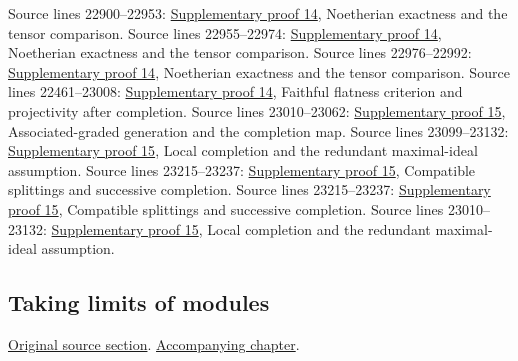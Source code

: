 \begin{AlgebraSourceRoutes}
 Source lines 22900--22953: \hyperlink{algebra_projectivity_completion_notes_20260927}{Supplementary proof 14}, Noetherian exactness and the tensor comparison.
 Source lines 22955--22974: \hyperlink{algebra_projectivity_completion_notes_20260927}{Supplementary proof 14}, Noetherian exactness and the tensor comparison.
 Source lines 22976--22992: \hyperlink{algebra_projectivity_completion_notes_20260927}{Supplementary proof 14}, Noetherian exactness and the tensor comparison.
 Source lines 22461--23008: \hyperlink{algebra_projectivity_completion_notes_20260927}{Supplementary proof 14}, Faithful flatness criterion and projectivity after completion.
 Source lines 23010--23062: \hyperlink{algebra_graded_completion_notes_20260927}{Supplementary proof 15}, Associated-graded generation and the completion map.
 Source lines 23099--23132: \hyperlink{algebra_graded_completion_notes_20260927}{Supplementary proof 15}, Local completion and the redundant maximal-ideal assumption.
 Source lines 23215--23237: \hyperlink{algebra_graded_completion_notes_20260927}{Supplementary proof 15}, Compatible splittings and successive completion.
 Source lines 23215--23237: \hyperlink{algebra_graded_completion_notes_20260927}{Supplementary proof 15}, Compatible splittings and successive completion.
 Source lines 23010--23132: \hyperlink{algebra_graded_completion_notes_20260927}{Supplementary proof 15}, Local completion and the redundant maximal-ideal assumption.
\end{AlgebraSourceRoutes}

\subsection{Taking limits of modules}
\hypertarget{algebra-source-section-limits}{}
\noindent\href{https://github.com/stacks/stacks-project/blob/a04446e57ec1fbc252a871afcec7752fb2807b14/algebra.tex\#L23247}{Original source section}. \href{algebra.pdf\#nameddest=section-limits}{Accompanying chapter}.

